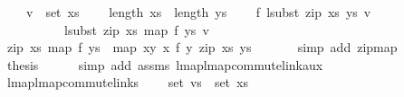 \begin{isabellebody}
\ \ \ \ {\isachardoublequoteopen}v\ {\isasymin}\ set\ xs{\isachardoublequoteclose}\isanewline
\ \ \ \ {\isachardoublequoteopen}length\ xs\ {\isacharequal}{\kern0pt}\ length\ ys{\isachardoublequoteclose}\isanewline
\ \ \ \ {\isachardoublequoteopen}f\ {\isacharparenleft}{\kern0pt}lsubst\ {\isacharparenleft}{\kern0pt}zip\ xs\ ys{\isacharparenright}{\kern0pt}\ v{\isacharparenright}{\kern0pt}\ {\isacharequal}{\kern0pt}\isanewline
\ \ \ \ \ \ \ \ \ \ lsubst\ {\isacharparenleft}{\kern0pt}zip\ xs\ {\isacharparenleft}{\kern0pt}map\ f\ ys{\isacharparenright}{\kern0pt}{\isacharparenright}{\kern0pt}\ v{\isachardoublequoteclose}\isanewline
%
\isadelimproof
%
\endisadelimproof
%
\isatagproof
{}\isamarkupfalse%
\ {\isacharminus}{\kern0pt}\isanewline
\ \ \ \isamarkupfalse%
\ {\isachardoublequoteopen}zip\ xs\ {\isacharparenleft}{\kern0pt}map\ f\ ys{\isacharparenright}{\kern0pt}\ {\isacharequal}{\kern0pt}\ map\ {\isacharparenleft}{\kern0pt}{\isasymlambda}{\isacharparenleft}{\kern0pt}x{\isacharcomma}{\kern0pt}y{\isacharparenright}{\kern0pt}{\isachardot}{\kern0pt}\ {\isacharparenleft}{\kern0pt}x{\isacharcomma}{\kern0pt}\ f\ y{\isacharparenright}{\kern0pt}{\isacharparenright}{\kern0pt}\ {\isacharparenleft}{\kern0pt}zip\ xs\ ys{\isacharparenright}{\kern0pt}{\isachardoublequoteclose}\isanewline
\ \ \ \ \ \isamarkupfalse%
\ {\isacharparenleft}{\kern0pt}simp\ add{\isacharcolon}{\kern0pt}\ zip{\isacharunderscore}{\kern0pt}map{}{\isacharparenright}{\kern0pt}\isanewline
\ \ \isamarkupfalse%
\ \isamarkupfalse%
\ {\isacharquery}{\kern0pt}thesis\isanewline
\ \ \ \ \isamarkupfalse%
\ {\isacharparenleft}{\kern0pt}simp\ add{\isacharcolon}{\kern0pt}\ assms{\isacharparenleft}{\kern0pt}{}{\isacharcomma}{\kern0pt}{}{\isacharparenright}{\kern0pt}\ lmap{\isacharunderscore}{\kern0pt}lmap{\isacharunderscore}{\kern0pt}commute{\isacharunderscore}{\kern0pt}link{\isacharunderscore}{\kern0pt}aux{\isacharparenright}{\kern0pt}\isanewline
{}\isamarkupfalse%
%
\endisatagproof
{\isafoldproof}%
%
\isadelimproof
\isanewline
%
\endisadelimproof
\isanewline
\isanewline
{}\isamarkupfalse%
\ lmap{\isacharunderscore}{\kern0pt}lmap{\isacharunderscore}{\kern0pt}commute{\isacharunderscore}{\kern0pt}links{\isacharcolon}{\kern0pt}\isanewline
\ \ \ \ {\isachardoublequoteopen}set\ vs\ {\isasymsubseteq}\ set\ xs{\isachardoublequoteclose}\isanewline

\end{isabellebody}
